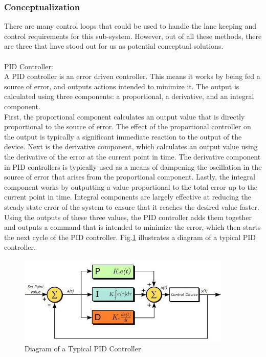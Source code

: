 \documentclass[titlepage,draft]{article}
\begin{document}
{\subsubsection{Conceptualization}
\label{KCConcept}

There are many control loops that could be used to handle the lane keeping and control requirements for this sub-system. However, out of all these methods, there are three that have stood out for us as potential conceptual solutions.\\~\\
\underline{PID Controller:}\\
\indent A PID controller is an error driven controller. This means it works by being fed a source of error, and outputs actions intended to minimize it. The output is calculated using three components: a proportional, a derivative, and an integral component. \\
\indent First, the proportional component calculates an output value that is directly proportional to the source of error. The effect of the proportional controller on the output is typically a significant immediate reaction to the output of the device. Next is the derivative component, which calculates an output value using the derivative of the error at the current point in time. The derivative component in PID controllers is typically used as a means of dampening the oscillation in the source of error that arises from the proportional component. Lastly, the integral component works by outputting a value proportional to the total error up to the current point in time. Integral components are largely effective at reducing the steady state error of the system to ensure that it reaches the desired value faster.  Using the outputs of these three values, the PID controller adds them together and outputs a command that is intended to minimize the error, which then starts the next cycle of the PID controller\cite{pid_explanation}. Fig.\ref{fig:piddiagram} illustrates a diagram of a typical PID controller.\\

\begin{figure}
	\centering
	\includegraphics[width=4in]{PID2.jpg}
	\caption{Diagram of a Typical PID Controller}
	\label{fig:piddiagram}
\end{figure}


}
\end{document}
